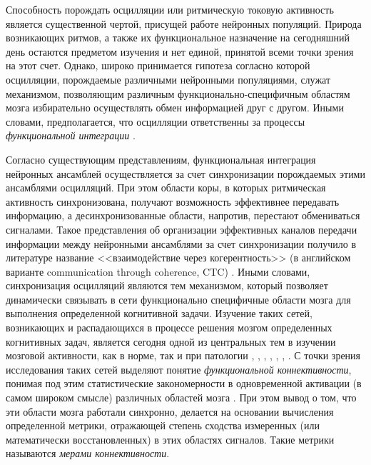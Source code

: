 Способность порождать осцилляции или ритмическую токовую активность является существенной чертой,
присущей работе нейронных популяций. Природа возникающих ритмов, а также их функциональное назначение
на сегодняшний день остаются предметом изучения и нет единой, принятой всеми точки зрения на этот счет.
Однако, широко принимается гипотеза согласно которой осцилляции, порождаемые различными нейронными популяциями,
служат механизмом, позволяющим различным функционально-специфичным областям мозга
избирательно осуществлять обмен информацией друг с другом. Иными словами, предполагается, что осцилляции ответственны за
процессы \emph{функциональной интеграции} \cite{}.

Согласно существующим представлениям, функциональная интеграция нейронных ансамблей осуществляется за
счет синхронизации порождаемых этими ансамблями осцилляций. При этом области коры, в которых ритмическая
активность синхронизована, получают возможность эффективнее передавать информацию, а десинхронизованные
области, напротив, перестают обмениваться сигналами. Такое представления об организации эффективных каналов
передачи информации между нейронными ансамблями за счет синхронизации получило в литературе название
<<взаимодействие через когерентность>> (в английском варианте communication through coherence, CTC)
. Иными словами, синхронизация осцилляций
являются тем механизмом, который позволяет динамически связывать в сети функционально специфичные области мозга
для выполнения определенной когнитивной задачи. Изучение таких сетей, возникающих и распадающихся в процессе решения мозгом
определенных когнитивных задач, является сегодня одной из центральных тем в изучении мозговой активности, как в норме,
так и при патологии ,
, ,
, , \cite{myself}, \cite{myself}.
С точки зрения исследования таких сетей выделяют понятие \emph{функциональной коннективности}, понимая
под этим статистические закономерности в одновременной активации (в самом широком смысле) различных областей мозга \cite{}.
При этом вывод о том, что эти области мозга работали синхронно, делается на основании вычисления
определенной метрики, отражающей степень сходства измеренных (или математически восстановленных) в этих областях сигналов.
Такие метрики называются \emph{мерами коннективности}.

